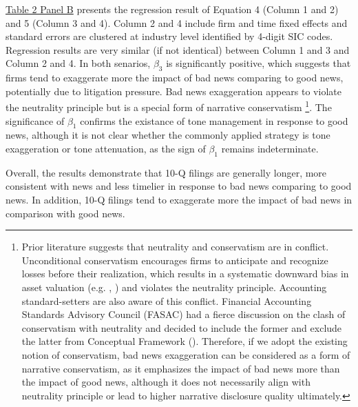 \documentclass[a4paper]{article}
\begin{document}
\begin{spacing}{2}
\hyperref[T2PB]{Table 2 Panel B} presents the regression result of Equation 4 (Column 1 and 2) and 5 (Column 3 and 4). Column 2 and 4 include firm and time fixed effects and standard errors are clustered at industry level identified by 4-digit SIC codes. Regression results are very similar (if not identical) between Column 1 and 3 and Column 2 and 4. In both senarios, $\beta_3$ is significantly positive, which suggests that firms tend to exaggerate more the impact of bad news comparing to good news, potentially due to litigation pressure. Bad news exaggeration appears to violate the neutrality principle but is a special form of narrative conservatism \footnote{Prior literature suggests that neutrality and conservatism are in conflict. Unconditional conservatism encourages firms to anticipate and recognize losses before their realization, which results in a systematic downward bias in asset valuation (e.g. \cite{wattsPositiveAccountingTheory1986}, \cite{penalvaConservatismDebtContracting2019}) and violates the neutrality principle. Accounting standard-setters are also aware of this conflict. Financial Accounting Standards Advisory Council (FASAC) had a fierce discussion on the clash of conservatism with neutrality and decided to include the former and exclude the latter from Conceptual Framework (\cite{fasacFASACMeetingHandouts2005}). Therefore, if we adopt the existing notion of conservatism, bad news exaggeration can be considered as a form of narrative conservatism, as it emphasizes the impact of bad news more than the impact of good news, although it does not necessarily align with neutrality principle or lead to higher narrative disclosure quality ultimately.}. The significance of $\beta_1$ confirms the existance of tone management in response to good news, although it is not clear whether the commonly applied strategy is tone exaggeration or tone attenuation, as the sign of $\beta_1$ remains indeterminate.

Overall, the results demonstrate that 10-Q filings are generally longer, more consistent with news and less timelier in response to bad news comparing to good news. In addition, 10-Q filings tend to exaggerate more the impact of bad news in comparison with good news. 


\end{spacing}
\end{document}
